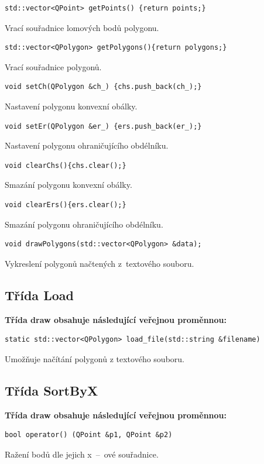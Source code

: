 \documentclass[a4paper, 12pt, oneside, titlepage]{article} %
\begin{document}
\begin{verbatim}
std::vector<QPoint> getPoints() {return points;}
\end{verbatim}
Vrací souřadnice lomových bodů polygonu.\\

\begin{verbatim}
std::vector<QPolygon> getPolygons(){return polygons;}
\end{verbatim}
Vrací souřadnice polygonů.\\

\begin{verbatim}
void setCh(QPolygon &ch_) {chs.push_back(ch_);}
\end{verbatim}
Nastavení polygonu konvexní obálky.\\

\begin{verbatim}
void setEr(QPolygon &er_) {ers.push_back(er_);}
\end{verbatim}
Nastavení polygonu ohraničujícího obdélníku.\\

\begin{verbatim}
void clearChs(){chs.clear();}
\end{verbatim}
Smazání polygonu konvexní obálky.\\

\begin{verbatim}
void clearErs(){ers.clear();}
\end{verbatim}
Smazání polygonu ohraničujícího obdélníku.\\

\begin{verbatim}
void drawPolygons(std::vector<QPolygon> &data);
\end{verbatim}
Vykreslení polygonů načtených z~textového souboru.\\

\subsection{Třída Load}
\textbf{Třída draw obsahuje následující veřejnou proměnnou:}
\begin{verbatim}
static std::vector<QPolygon> load_file(std::string &filename)
\end{verbatim}
Umožňuje načítání polygonů z textového souboru.\\

\subsection{Třída SortByX}
\textbf{Třída draw obsahuje následující veřejnou proměnnou:}
\begin{verbatim}
bool operator() (QPoint &p1, QPoint &p2)
\end{verbatim}
Ražení bodů dle jejich x~--~ové souřadnice.\\
\end{document}

